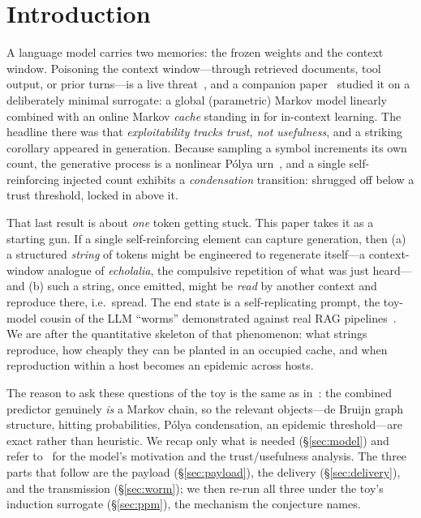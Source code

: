 \documentclass[11pt]{article}
\theoremstyle{plain}
\theoremstyle{definition}
\theoremstyle{remark}
\begin{document}
\section{Introduction}\label{sec:intro}
A language model carries two memories: the frozen weights and the context window. Poisoning
the context window---through retrieved documents, tool output, or prior turns---is a live
threat~\cite{greshake2023,cohen2024}, and a companion paper~\cite{shumow2026trust} studied it
on a deliberately minimal surrogate: a global (parametric) Markov model linearly combined
with an online Markov \emph{cache} standing in for in-context learning. The headline there was
that \emph{exploitability tracks trust, not usefulness}, and a striking corollary appeared in
generation. Because sampling a symbol increments its own count, the generative process is a
nonlinear P\'olya urn~\cite{pemantle2007}, and a single self-reinforcing injected count
exhibits a \emph{condensation} transition: shrugged off below a trust threshold, locked in
above it.

That last result is about \emph{one} token getting stuck. This paper takes it as a starting
gun. If a single self-reinforcing element can capture generation, then (a) a structured
\emph{string} of tokens might be engineered to regenerate itself---a context-window analogue
of \emph{echolalia}, the compulsive repetition of what was just heard---and (b) such a string,
once emitted, might be \emph{read} by another context and reproduce there, i.e.\ spread. The
end state is a self-replicating prompt, the toy-model cousin of the LLM ``worms'' demonstrated
against real RAG pipelines~\cite{cohen2024}. We are after the quantitative skeleton of that
phenomenon: what strings reproduce, how cheaply they can be planted in an occupied cache, and
when reproduction within a host becomes an epidemic across hosts.

The reason to ask these questions of the toy is the same as in~\cite{shumow2026trust}: the
combined predictor genuinely \emph{is} a Markov chain, so the relevant objects---de Bruijn
graph structure, hitting probabilities, P\'olya condensation, an epidemic threshold---are
exact rather than heuristic. We recap only what is needed (\S\ref{sec:model}) and refer
to~\cite{shumow2026trust} for the model's motivation and the trust/usefulness analysis. The
three parts that follow are the payload (\S\ref{sec:payload}), the delivery
(\S\ref{sec:delivery}), and the transmission (\S\ref{sec:worm}); we then re-run all three
under the toy's induction surrogate (\S\ref{sec:ppm}), the mechanism the conjecture names.
\end{document}
